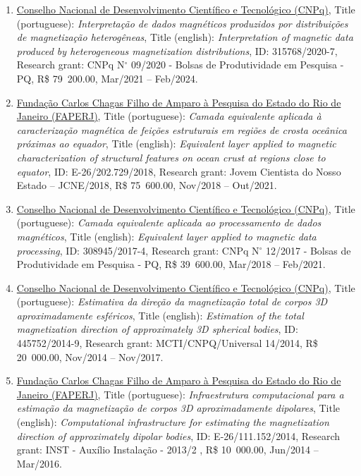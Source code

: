 \documentclass[11pt,a4paper,onecolumn]{article}
\newcommand{\FundingEntry}[9]{
	\noindent #1, Title (#2): \textit{#3}, Title (#4): \textit{#5}, ID: #6, Research grant: #7, R\$ #8, #9.}
\begin{document}
\begin{enumerate}[leftmargin=*, label=\textbf{(\arabic*)}]
	
	\item\FundingEntry{\href{https://cnpq.br/pagina-inicial}{Conselho Nacional de Desenvolvimento Cient{\' i}fico e Tecnol\'{o}gico (CNPq)}}{portuguese}{Interpreta{\c c}{\~ a}o de dados magn{\'e}ticos produzidos por distribui{\c c}{\~o}es de magnetiza{\c c}{\~a}o heterog{\^e}neas}{english}{Interpretation of magnetic data produced by heterogeneous magnetization distributions}{315768/2020-7}{CNPq N$^{\circ}$ 09/2020 - Bolsas de Produtividade em Pesquisa - PQ}{79~200.00}{Mar/2021 -- Feb/2024}

	\item\FundingEntry{\href{https://www.faperj.br/}{Funda\c{c}\~{a}o Carlos Chagas Filho de Amparo \`{a} Pesquisa do Estado do Rio de Janeiro (FAPERJ)}}{portuguese}{Camada equivalente aplicada {\` a}  caracteriza{\c c}{\~ a}o magn{\' e}tica de fei{\c c}{\~ o}es estruturais em regi{\~ o}es de  crosta oce{\^ a}nica pr{\' o}ximas ao equador}{english}{Equivalent layer applied to magnetic characterization of structural features on ocean crust at regions close to equator}{E-26/202.729/2018}{Jovem Cientista do Nosso Estado – JCNE/2018}{75~600.00}{Nov/2018 -- Out/2021}
	
	\item\FundingEntry{\href{https://cnpq.br/pagina-inicial}{Conselho Nacional de Desenvolvimento Cient{\' i}fico e Tecnol\'{o}gico (CNPq)}}{portuguese}{Camada equivalente aplicada ao processamento de dados magn{\' e}ticos}{english}{Equivalent layer applied to magnetic data processing}{308945/2017-4}{CNPq N$^{\circ}$ 12/2017 - Bolsas de Produtividade em Pesquisa - PQ}{39~600.00}{Mar/2018 -- Feb/2021}
	
	\item\FundingEntry{\href{https://cnpq.br/pagina-inicial}{Conselho Nacional de Desenvolvimento Cient\'{i}fico e Tecnol\'{o}gico (CNPq)}}{portuguese}{Estimativa da dire\c{c}\~{a}o da magnetiza\c{c}\~{a}o total de corpos 3D aproximadamente esf\'{e}ricos}{english}{Estimation of the total magnetization direction of approximately 3D spherical bodies}{445752/2014-9}{MCTI/CNPQ/Universal 14/2014}{20~000.00}{Nov/2014 -- Nov/2017}
	
	\item\FundingEntry{\href{https://www.faperj.br/}{Funda\c{c}\~{a}o Carlos Chagas Filho de Amparo \`{a} Pesquisa do Estado do Rio de Janeiro (FAPERJ)}}{portuguese}{Infraestrutura computacional para a estima\c{c}\~{a}o da magnetiza\c{c}\~{a}o de corpos 3D aproximadamente dipolares}{english}{Computational infrastructure for estimating the magnetization direction of approximately dipolar bodies}{E-26/111.152/2014}{INST - Aux{\' i}lio Instala{\c c}{\~ a}o - 2013/2 }{10~000.00}{Jun/2014 -- Mar/2016}
	
\end{enumerate}


{}
\end{document}
